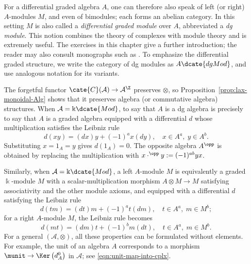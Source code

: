 For a differential graded algebra $A$, one can therefore also speak of left
(or right) $A$-modules $M$, and even of bimodules; each forms an abelian
category. In this setting $M$ is also called a \emph{differential graded
module} over $A$, abbreviated a \emph{dg module}. This notion combines the
theory of complexes with module theory and is extremely useful. The exercises
in this chapter give a further introduction; the reader may also consult
monographs such as \cite{Yek20}. To emphasize the differential graded
structure, we write the category of dg modules as $A\dcate{dgMod}$, and use
analogous notation for its variants.

The forgetful functor $\cate{C}(\mathcal{A})\to\mathcal{A}^{\Z}$ preserves
$\otimes$, so Proposition~\ref{prop:lax-monoidal-Alg} shows that it preserves
algebra (or commutative algebra) structures. When
$\mathcal{A}=\Bbbk\dcate{Mod}$, to say that $A$ is a dg algebra is precisely
to say that $A$ is a graded algebra equipped with a differential $d$ whose
multiplication satisfies the Leibniz rule
\[ d(xy) = (dx)y + (-1)^a x (dy), \quad x \in A^a, \; y \in A^b. \]
Substituting $x=1_A=y$ gives $d(1_A)=0$. The opposite algebra $A^{\opp}$ is
obtained by replacing the multiplication with
$x\mathbin{\cdot^{\opp}}y:=(-1)^{ab}yx$.

Similarly, when $\mathcal{A}=\Bbbk\dcate{Mod}$, a left $A$-module $M$ is
equivalently a graded $\Bbbk$-module $M$ with a scalar-multiplication morphism
$A\otimes M\to M$ satisfying associativity and the other module axioms, and
equipped with a differential $d$ satisfying the Leibniz rule
\[ d(tm) = (dt)m + (-1)^a t (dm), \quad t \in A^a, \; m \in M^b; \]
for a right $A$-module $M$, the Leibniz rule becomes
\[ d(mt) = (dm)t + (-1)^b m (dt), \quad t \in A^a, \; m \in M^b. \]
For a general $(\mathcal{A},\otimes)$, all these properties can be formulated
without elements. For example, the unit of an algebra $A$ corresponds to a
morphism $\munit\to\Ker\left(d_A^0\right)$ in $\mathcal{A}$; see
\eqref{eqn:unit-map-into-cplx}.

